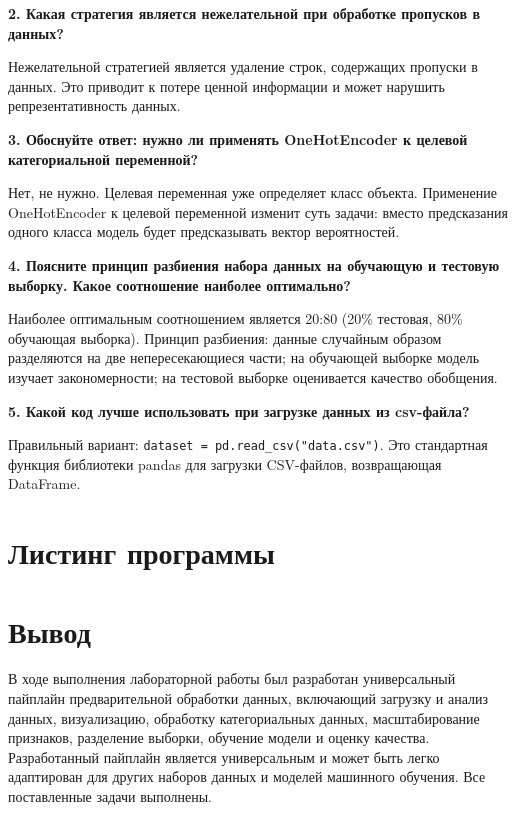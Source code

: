 \textbf{2. Какая стратегия является нежелательной при обработке пропусков в данных?}

Нежелательной стратегией является удаление строк, содержащих пропуски в данных. Это приводит к потере ценной информации и может нарушить репрезентативность данных.

\textbf{3. Обоснуйте ответ: нужно ли применять OneHotEncoder к целевой категориальной переменной?}

Нет, не нужно. Целевая переменная уже определяет класс объекта. Применение OneHotEncoder к целевой переменной изменит суть задачи: вместо предсказания одного класса модель будет предсказывать вектор вероятностей.

\textbf{4. Поясните принцип разбиения набора данных на обучающую и тестовую выборку. Какое соотношение наиболее оптимально?}

Наиболее оптимальным соотношением является 20:80 (20\% тестовая, 80\% обучающая выборка). Принцип разбиения: данные случайным образом разделяются на две непересекающиеся части; на обучающей выборке модель изучает закономерности; на тестовой выборке оценивается качество обобщения.

\textbf{5. Какой код лучше использовать при загрузке данных из csv-файла?}

Правильный вариант: \texttt{dataset = pd.read\_csv("data.csv")}. Это стандартная функция библиотеки pandas для загрузки CSV-файлов, возвращающая DataFrame.

\section{Листинг программы}



\section*{Вывод}

В ходе выполнения лабораторной работы был разработан универсальный пайплайн предварительной обработки данных, включающий загрузку и анализ данных, визуализацию, обработку категориальных данных, масштабирование признаков, разделение выборки, обучение модели и оценку качества. Разработанный пайплайн является универсальным и может быть легко адаптирован для других наборов данных и моделей машинного обучения. Все поставленные задачи выполнены.

\endinput